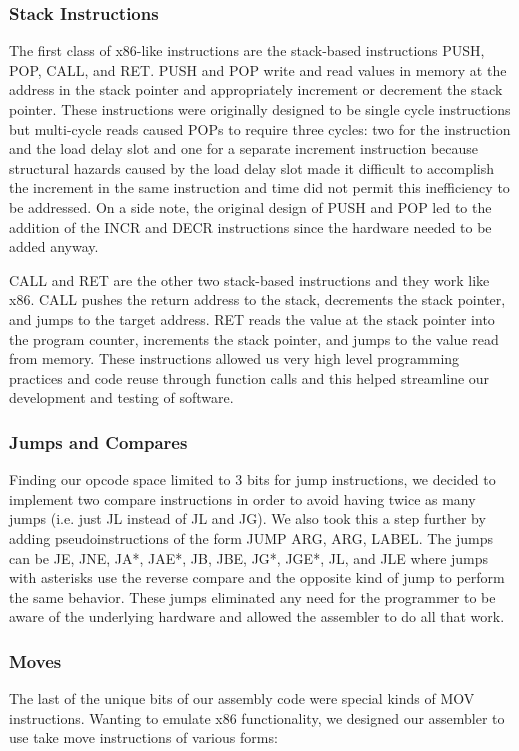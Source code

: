 \documentclass[onecolumn]{IEEEtran}
\begin{document}
\subsubsection{Stack Instructions}
The first class of x86-like instructions are the stack-based instructions PUSH, POP, CALL, and RET.  PUSH and POP write and read values in memory at the address in the stack pointer and appropriately increment or decrement the stack pointer.  These instructions were originally designed to be single cycle instructions but multi-cycle reads caused POPs to require three cycles: two for the instruction and the load delay slot and one for a separate increment instruction because structural hazards caused by the load delay slot made it difficult to accomplish the increment in the same instruction and time did not permit this inefficiency to be addressed.  On a side note, the original design of PUSH and POP led to the addition of the INCR and DECR instructions since the hardware needed to be added anyway.

CALL and RET are the other two stack-based instructions and they work like x86.  CALL pushes the return address to the stack, decrements the stack pointer, and jumps to the target address.  RET reads the value at the stack pointer into the program counter, increments the stack pointer, and jumps to the value read from memory.  These instructions allowed us very high level programming practices and code reuse through function calls and this helped streamline our development and testing of software. 

\subsubsection{Jumps and Compares}
Finding our opcode space limited to 3 bits for jump instructions, we decided to implement two compare instructions in order to avoid having twice as many jumps (i.e. just JL instead of JL and JG).  We also took this a step further by adding pseudoinstructions of the form JUMP ARG, ARG, LABEL.  The jumps can be JE, JNE, JA*, JAE*, JB, JBE, JG*, JGE*, JL, and JLE where jumps with asterisks use the reverse compare and the opposite kind of jump to perform the same behavior.  These jumps eliminated any need for the programmer to be aware of the underlying hardware and allowed the assembler to do all that work.

\subsubsection{Moves}
The last of the unique bits of our assembly code were special kinds of MOV instructions.  Wanting to emulate x86 functionality, we designed our assembler to use take move instructions of various forms: 
\end{document}
